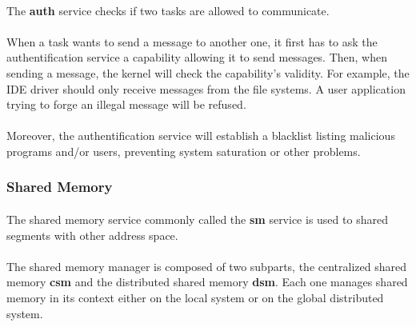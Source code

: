 \documentclass[10pt,a4wide]{article}
\begin{document}
\begin{multicols}{2}
\paragraph{}

The \textbf{auth} service checks if two tasks are allowed to communicate.

\paragraph{}

When a task wants to send a message to another one, it first has to ask
the authentification service a capability allowing it to send messages. Then,
when sending a message, the kernel will check the capability's validity.
For example, the IDE driver should only receive messages from the file systems.
A user application trying to forge an illegal message will be refused.

\paragraph{}

Moreover, the authentification service will establish a blacklist listing
malicious programs and/or users, preventing system saturation or other
problems.

\subsubsection{Shared Memory}

\paragraph{}

The shared memory service commonly called the \textbf{sm} service is used
to shared segments with other address space.

\paragraph{}

The shared memory manager is composed of two subparts, the centralized
shared memory \textbf{csm} and the distributed shared memory \textbf{dsm}.
Each one manages shared memory in its context either on the local system
or on the global distributed system.

\paragraph{}


\end{multicols}
\end{document}
